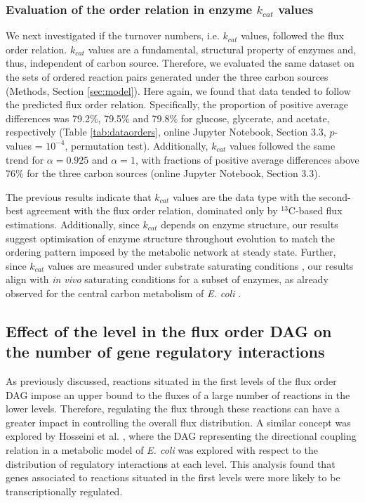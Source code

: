 \documentclass[12pt]{article}
\begin{document}
\subsubsection{Evaluation of the order relation in enzyme $k_{cat}$ values}
We next investigated if the turnover numbers, i.e. $k_{cat}$ values, followed the flux order relation. $k_{cat}$ values are a fundamental, structural property of enzymes and, thus, independent of carbon source. Therefore, we evaluated the same dataset on the sets of ordered reaction pairs generated under the three carbon sources (Methods, Section \ref{sec:model}). Here again, we found that data tended to follow the predicted flux order relation. Specifically, the proportion of positive average differences was 79.2\%, 79.5\% and 79.8\% for glucose, glycerate, and acetate, respectively (Table \ref{tab:dataorders}, online Jupyter Notebook, Section 3.3, $p$-values = $10^{-4}$, permutation test). {\color{blue} Additionally, $k_{cat}$ values followed the same trend for $\alpha=0.925$ and $\alpha=1$, with fractions of positive average differences above 76\% for the three carbon sources (online Jupyter Notebook, Section 3.3).}

The previous results indicate that $k_{cat}$ values are the data type with the second-best agreement with the flux order relation, dominated only by ${}^{13}\mathrm{C}$-based flux estimations.  Additionally, since $k_{cat}$ depends on enzyme structure, our results suggest optimisation of enzyme structure throughout evolution to match the ordering pattern imposed by the metabolic network at steady state. Further, since $k_{cat}$ values are measured under substrate saturating conditions \cite{Davidi2016}, our results align with \emph{in vivo} saturating conditions for a subset of enzymes, as already observed for the central carbon metabolism of \emph{E. coli} \cite{Bennett2009a}.

\subsection{Effect of the level in the flux order DAG on the number of gene regulatory interactions}
As previously discussed, reactions situated in the first levels of the flux order DAG impose an upper bound to the fluxes of a large number of reactions in the lower levels. Therefore, regulating the flux through these reactions can have a greater impact in controlling the overall flux distribution. A similar concept was explored by Hosseini et al. \cite{Hosseini2015}, where the DAG representing the directional coupling relation in a metabolic model of \emph{E. coli} was explored with respect to the distribution of regulatory interactions at each level. This analysis found that genes associated to reactions situated in the first levels were more likely to be transcriptionally regulated.
\end{document}
